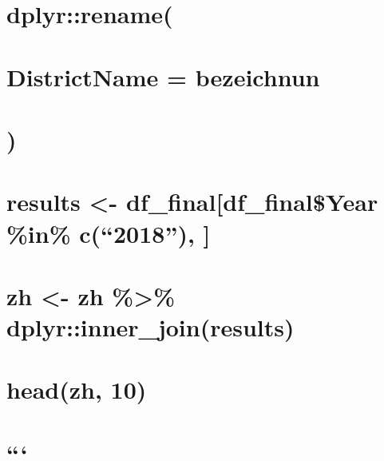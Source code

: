\documentclass[
]{article}
\begin{document}
\hypertarget{dplyrrename}{%
\section{dplyr::rename(}\label{dplyrrename}}

\hypertarget{districtname-bezeichnun}{%
\section{DistrictName = bezeichnun}\label{districtname-bezeichnun}}

\hypertarget{section}{%
\section{)}\label{section}}

\hypertarget{results---df_finaldf_finalyear-in-c2018}{%
\section{results \textless- df\_final{[}df\_final\$Year \%in\%
c(``2018''), {]}}\label{results---df_finaldf_finalyear-in-c2018}}

\hypertarget{zh---zh-dplyrinner_joinresults}{%
\section{zh \textless- zh \%\textgreater\%
dplyr::inner\_join(results)}\label{zh---zh-dplyrinner_joinresults}}

\hypertarget{headzh-10}{%
\section{head(zh, 10)}\label{headzh-10}}

\hypertarget{section-1}{%
\section{```}\label{section-1}}
\end{document}

